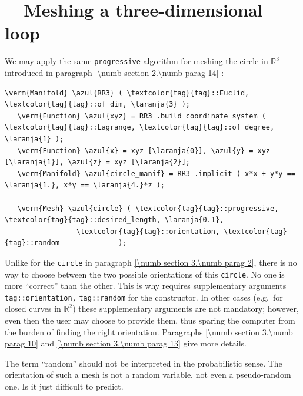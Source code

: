 \section{~~Meshing a three-dimensional loop}\label{\numb section 3.\numb parag 4}

We may apply the same {\small\tt progressive} algorithm for meshing the circle in
$ \mathbb{R}^3 $ introduced in paragraph \ref{\numb section 2.\numb parag 14} :

\begin{Verbatim}[commandchars=\\\{\},formatcom=\small\tt,frame=single,
   label=parag-\ref{\numb section 3.\numb parag 4}.cpp,rulecolor=\color{coment},
   baselinestretch=0.94,framesep=2mm                                            ]
   \verm{Manifold} \azul{RR3} ( \textcolor{tag}{tag}::Euclid, \textcolor{tag}{tag}::of_dim, \laranja{3} );
   \verm{Function} \azul{xyz} = RR3 .build_coordinate_system ( \textcolor{tag}{tag}::Lagrange, \textcolor{tag}{tag}::of_degree, \laranja{1} );
   \verm{Function} \azul{x} = xyz [\laranja{0}], \azul{y} = xyz [\laranja{1}], \azul{z} = xyz [\laranja{2}];
   \verm{Manifold} \azul{circle_manif} = RR3 .implicit ( x*x + y*y == \laranja{1.}, x*y == \laranja{4.}*z );
   
   \verm{Mesh} \azul{circle} ( \textcolor{tag}{tag}::progressive, \textcolor{tag}{tag}::desired_length, \laranja{0.1},
                 \textcolor{tag}{tag}::orientation, \textcolor{tag}{tag}::random              );
\end{Verbatim}

Unlike for the {\small\tt circle} in paragraph \ref{\numb section 3.\numb parag 2},
there is no way to choose between the two possible orientations of this {\small\tt circle}.
No one is more ``correct'' than the other.
This is why {\maniFEM} requires supplementary arguments
{\small\tt\textcolor{tag}{tag}::orientation,} {\small\tt\textcolor{tag}{tag}::random}
for the {\small\tt{}} constructor.
In other cases (e.g.\ for closed curves in $ \mathbb{R}^2 $) these supplementary arguments
are not mandatory; however, even then the user may choose to provide them,
thus sparing the computer from the burden of finding the right orientation.
Paragraphs \ref{\numb section 3.\numb parag 10} and \ref{\numb section 3.\numb parag 13}
give more details.

The term ``random'' should not be interpreted in the probabilistic sense.
The orientation of such a mesh is not a random variable, not even a pseudo-random one.
Is it just difficult to predict.

